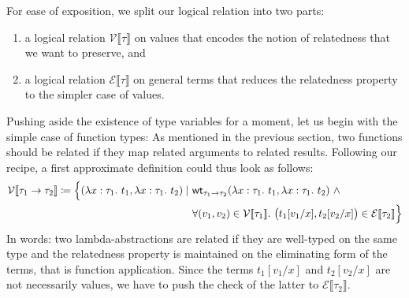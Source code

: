 \documentclass[12pt]{article}
\theoremstyle{plain}
\theoremstyle{definition}
\newcommand{\denot}[1]{\llbracket#1\rrbracket}
\newcommand{\vint}[1]{\mathcal{V}\denot{#1}}
\newcommand{\tint}[1]{\mathcal{E}\denot{#1}}
\newcommand{\wt}[1]{\mathsf{wt}_{#1}}
\begin{document}
For ease of exposition, we split our logical relation into two parts:
\begin{enumerate}
\item a logical relation $\vint{\tau}$ on values that encodes the notion of relatedness that we want to preserve, and
\item a logical relation $\tint{\tau}$ on general terms that reduces the relatedness property to the simpler case of values.
\end{enumerate}
Pushing aside the existence of type variables for a moment,
let us begin with the simple case of function types:
As mentioned in the previous section,
two functions should be related if they map related arguments to related results.
Following our recipe, a first approximate definition could thus look as follows:
\begin{align*}
  \vint{\tau_1\to\tau_2}\coloneqq
  \Bigl\{(\lambda x : \tau_1.\ t_1, \lambda x : \tau_1.\ t_2) \mid\
  &\wt{\tau_1\to\tau_2}(\lambda x : \tau_1.\ t_1, \lambda x : \tau_1.\ t_2)\ \land\\
  &\forall (v_1,v_2)\in\vint{\tau_1}.\ \bigl(t_1[v_1/x],t_2[v_2/x]\bigr)\in\tint{\tau_2} \Bigr\}
\end{align*}
In words: two lambda-abstractions are related if they are well-typed on the same type
and the relatedness property is maintained on the eliminating form of the terms, that is function application.
Since the terms $t_1[v_1/x]$ and $t_2[v_2/x]$ are not necessarily values,
we have to push the check of the latter to $\tint{\tau_2}$.
\end{document}
